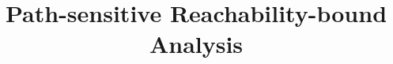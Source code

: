 \documentclass[runningheads]{llncs}
\begin{document}
%
\title{Path-sensitive Reachability-bound Analysis}
%
%
%

\maketitle              
\end{document}

